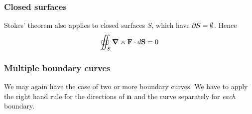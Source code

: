\documentclass{../template/note}
\begin{document}
    \subsubsection{Closed surfaces}

    Stokes' theorem also applies to closed surfaces \(S\), which have \(\partial S = \emptyset\). Hence
    \begin{align*}
        \oiint_S \curl \V F \cdot d\V S = 0
    \end{align*}
    
    \subsubsection{Multiple boundary curves}
    
    We may again have the case of two or more boundary curves. We have to apply the right hand rule for the directions of \(\V n\) and the curve separately for \emph{each} boundary.
    
\end{document}
